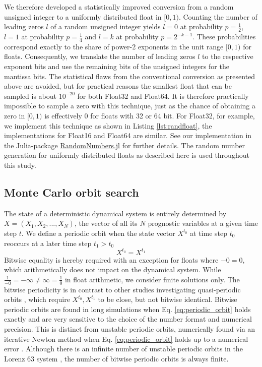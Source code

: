 We therefore developed a statistically improved conversion from a random unsigned integer to a uniformly distributed
float in $[0,1)$. Counting the number of leading zeros $l$ of a random unsigned integer yields $l = 0$ at probability
$p = \tfrac{1}{2}$, $l=1$ at probability $p=\tfrac{1}{4}$ and $l = k$ at probability $p=2^{-k-1}$. These probabilities
correspond exactly to the share of power-2 exponents in the unit range $[0,1)$ for floats.
Consequently, we translate the number of leading zeros $l$  to the respective exponent bits and use the remaining
bits of the unsigned integers for the mantissa bits. The statistical flaws from the conventional conversion as presented
above are avoided, but for practical reasons the smallest float that can be sampled is about $10^{-20}$ for both Float32
and Float64. It is therefore practically impossible to sample a zero with this technique, just as the chance of obtaining a
zero in $[0,1)$ is effectively 0 for floats with 32 or 64 bit. For Float32, for example, we implement this technique as shown
in Listing \ref{lst:randfloat}, the implementations for Float16 and Float64 are similar. See our implementation in the Julia-package
\href{https://github.com/JuliaRandom/RandomNumbers.jl}{RandomNumbers.jl} for further details. The random number generation
for uniformly distributed floats as described here is used throughout this study.

\subsection{Monte Carlo orbit search}
\label{sec:orbit_search}

The state of a deterministic dynamical system is entirely determined by $X = (X_1,X_2,...,X_N)$, the vector of all its $N$
prognostic variables at a given time step $t$. We define a periodic orbit when the state vector $X^{t_0}$ at time step $t_0$
reoccurs at a later time step $t_1 > t_0$
\begin{equation}
	X^{t_0} = X^{t_1}
	\label{eq:periodic_orbit}
\end{equation}
Bitwise equality is hereby required with an exception for floats where $-0 = 0$, which arithmetically does not impact on the
dynamical system. While $\tfrac{1}{-0} = -\infty \neq \infty = \tfrac{1}{0}$ in float arithmetic, we consider finite solutions only.
The bitwise periodicity is in contrast to other studies investigating quasi-periodic orbits \citep{Urminsky2010,Yalniz2021},
which require $X^{t_0}, X^{t_1}$ to be close, but not bitwise identical. Bitwise periodic orbits are found in long simulations
when Eq. \ref{eq:periodic_orbit} holds exactly and are very sensitive to the choice of the number format and numerical
precision. This is distinct from unstable periodic orbits, numerically found via an iterative Newton method when
Eq. \ref{eq:periodic_orbit} holds up to a numerical error \citep{Viswanath2007}. Although there is an infinite number of unstable
periodic orbits in the Lorenz 63 system \citep{Capinski2018,Lorenz1963}, the number of bitwise periodic orbits is always finite.

